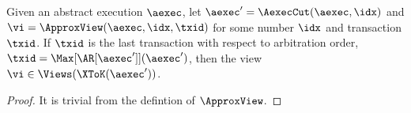 \begin{toappendix}
\label{sec:proof-approx-view}
\begin{proposition}
\label{prop:well-defined-approx-view}
Given an abstract execution \( \aexec \),
let \( \aexec' = \AexecCut(\aexec,\idx) \) and 
\( \vi = \ApproxView(\aexec,\idx,\txid) \) for some number \( \idx \) and transaction \( \txid \).
If \( \txid \) is the last transaction with respect to arbitration order, \( \txid = \Max[\AR[\aexec']](\aexec')\),
then the view \( \vi \in \Views(\XToK(\aexec')) \).
\end{proposition}
\begin{proof}
It is trivial from the defintion of \(\ApproxView\).
\end{proof}
\end{toappendix}

